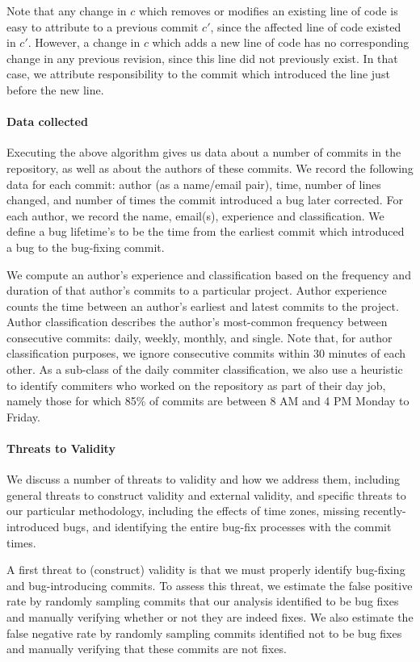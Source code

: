 Note that any change in $c$ which removes or modifies an existing line
of code is easy to attribute to a previous commit $c'$, since the
affected line of code existed in $c'$. However, a change in $c$ which
adds a new line of code has no corresponding change in any previous
revision, since this line did not previously exist. In that case, we
attribute responsibility to the commit which introduced the line just
before the new line.

\paragraph{Data collected}
Executing the above algorithm gives us data about a number of commits
in the repository, as well as about the authors of these commits.  We
record the following data for each commit: author (as a name/email
pair), time, number of lines changed, and number of times the commit
introduced a bug later corrected. For each author, we record the name,
email(s), experience and classification. We define a bug lifetime's to
be the time from the earliest commit which introduced a bug to the
bug-fixing commit.

We compute an author's experience and classification based on the
frequency and duration of that author's commits to a particular
project. Author experience counts the time between an author's
earliest and latest commits to the project. Author classification
describes the author's most-common frequency between consecutive
commits: daily, weekly, monthly, and single. Note that, for author
classification purposes, we ignore consecutive commits within 30
minutes of each other. As a sub-class of the daily commiter
classification, we also use a heuristic to identify commiters who
worked on the repository as part of their day job, namely those for
which 85\% of commits are between 8 AM and 4 PM Monday to Friday.

\paragraph{Threats to Validity}
We discuss a number of threats to validity and how we address them,
including general threats to construct validity and external validity,
and specific threats to our particular methodology, including the
effects of time zones, missing recently-introduced bugs, and
identifying the entire bug-fix processes with the commit times.

A first threat to (construct) validity is that we must properly
identify bug-fixing and bug-introducing commits. To assess this
threat, we estimate the false positive rate by randomly sampling
commits that our analysis identified to be bug fixes and manually
verifying whether or not they are indeed fixes.  We also estimate the
false negative rate by randomly sampling commits identified not to be
bug fixes and manually verifying that these commits are not fixes.

